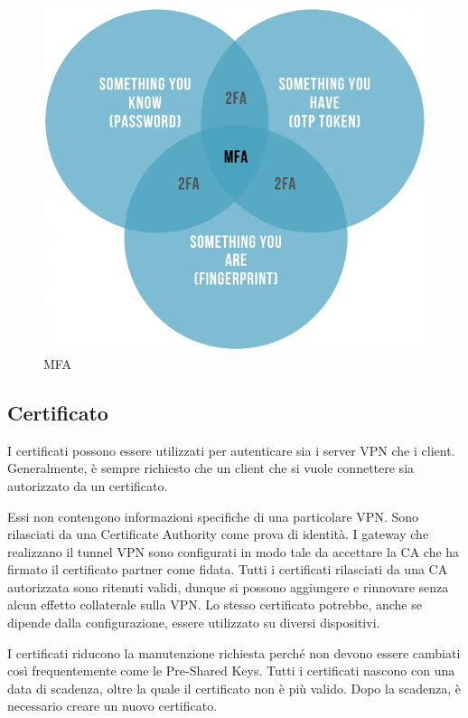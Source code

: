 \begin{figure}[ht]
    \centering
    \includegraphics[width=12cm]{figure/mfa.jpeg}
    \caption{MFA}
\end{figure}

\subsection{Certificato}

I certificati possono essere utilizzati per autenticare sia i server VPN che i client. Generalmente, è sempre richiesto che un client che si vuole connettere sia autorizzato da un certificato.

Essi non contengono informazioni specifiche di una particolare VPN. Sono rilasciati da una Certificate Authority come prova di identità. I gateway che realizzano il tunnel VPN sono configurati in modo tale da accettare la CA che ha firmato il certificato partner come fidata. Tutti i certificati rilasciati da una CA autorizzata sono ritenuti validi, dunque si possono aggiungere e rinnovare senza alcun effetto collaterale sulla VPN. Lo stesso certificato potrebbe, anche se dipende dalla configurazione, essere utilizzato su diversi dispositivi.

I certificati riducono la manutenzione richiesta perché non devono essere cambiati così frequentemente come le Pre-Shared Keys. Tutti i certificati nascono con una data di scadenza, oltre la quale il certificato non è più valido. Dopo la scadenza, è necessario creare un nuovo certificato.

